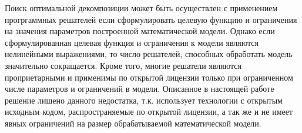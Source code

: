 Поиск оптимальной декомпозиции может быть осуществлен с применением прогргаммных решателей если сформулировать целевую функцию и ограничения на значения параметров построенной математической модели. Однако если сформулированная целевая функция и ограничения к модели являются нелинейными выражениями, то число решателей, способных обработать модель значительно сокращается. Кроме того, многие решатели являются проприетарными и применимы по открытой лицензии только при ограниченном числе параметров и ограничений в модели. Описанное в настоящей работе решение лишено данного недостатка, т.к. использует технологии с открытым исходным кодом, распространяемые по открытой лицензии, а так же и не имеет явных ограничений на размер обрабатываемой математической модели.

